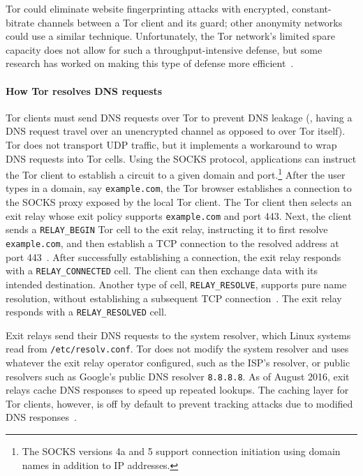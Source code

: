Tor could eliminate website fingerprinting
attacks with encrypted, constant-bitrate channels between a Tor client and
its guard; other anonymity networks could use a similar technique.
Unfortunately, the Tor network's limited spare capacity does not
allow for such a throughput-intensive defense, but some research has
worked on making this type of defense
more efficient~\cite{Cai2014a,Juarez2016a,Wang2015a,adapativepadding}.

\paragraph{How Tor resolves DNS requests}
Tor clients must send DNS requests over Tor to prevent DNS {leakage}
(\ie, having a
DNS request travel over an unencrypted channel as opposed to over Tor
itself).  Tor does not transport UDP
traffic, but it implements a workaround to wrap DNS requests into Tor cells.
Using the
SOCKS protocol, applications can instruct the Tor client to establish a circuit to a
given domain and port.\footnote{The SOCKS versions 4a and 5 support connection
initiation using domain names in addition to IP addresses.}
After the user types in a domain, say {\tt example.com}, the Tor browser establishes
a connection to the SOCKS proxy exposed by the local Tor client.
The Tor client then
selects an exit relay whose exit policy supports {\tt example.com} and port 443.
Next, the client sends a \texttt{RELAY\_BEGIN} Tor cell to the exit relay,
instructing it to first resolve {\tt example.com}, and then establish a TCP
connection to the resolved
address at port 443~\cite[\S~6.2]{tor-spec}.  After successfully establishing a
connection, the exit relay responds with a \texttt{RELAY\_CONNECTED}
cell.  The client can then exchange data with its intended
destination.  Another type of cell, \texttt{RELAY\_RESOLVE}, supports pure name
resolution, without establishing a subsequent TCP
connection~\cite[\S~6.4]{tor-spec}.  The exit relay responds with a
\texttt{RELAY\_RESOLVED} cell.

Exit relays send
their DNS requests to the system resolver, which Linux systems read from
\texttt{/etc/resolv.conf}.  Tor does not modify the system resolver and
uses whatever the exit relay operator configured, such as the ISP's resolver,
or public resolvers such as Google's public DNS resolver {\tt 8.8.8.8}.
As of August 2016, exit relays cache DNS responses to speed up repeated lookups.
The caching layer for Tor clients, however, is off by default to prevent tracking attacks
due to modified DNS responses~\cite{nolocalcache}.
